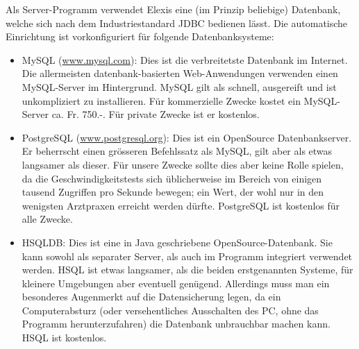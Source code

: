 Als Server-Programm verwendet Elexis eine (im Prinzip beliebige) Datenbank, welche sich nach dem
Industriestandard JDBC bedienen lässt. Die automatische Einrichtung ist vorkonfiguriert für folgende
Datenbanksysteme:
\begin{itemize}
\item MySQL (\href{http://www.mysql.com}{www.mysql.com}): Dies ist die verbreitetste Datenbank im Internet. Die allermeisten
datenbank-basierten
 Web-Anwendungen verwenden einen MySQL-Server im Hintergrund. MySQL gilt als schnell, ausgereift und ist
 unkompliziert zu installieren. Für kommerzielle Zwecke kostet ein MySQL-Server ca. Fr. 750.-. Für private
 Zwecke ist er kostenlos.

\item PostgreSQL (\href{http://www.postgresql.org}{www.postgresql.org}): Dies ist
ein OpenSource Datenbankserver. Er beherrscht einen grösseren Befehlssatz als MySQL,
 gilt aber als etwas langsamer als dieser. Für unsere Zwecke sollte dies aber keine Rolle spielen, da die
 Geschwindigkeitstests sich üblicherweise im Bereich von einigen tausend Zugriffen pro Sekunde bewegen;
 ein Wert, der wohl nur in den wenigsten Arztpraxen erreicht werden dürfte. PostgreSQL ist kostenlos für alle
 Zwecke.

\item HSQLDB: Dies ist eine in Java geschriebene OpenSource-Datenbank. Sie kann sowohl als separater Server, als auch
im Programm integriert verwendet werden. HSQL ist etwas langsamer, als die beiden erstgenannten Systeme, für kleinere
Umgebungen aber eventuell genügend. Allerdings muss man ein besonderes Augenmerkt auf die Datensicherung legen, da ein
Computerabsturz (oder versehentliches Ausschalten des PC, ohne das Programm herunterzufahren) die Datenbank unbrauchbar
machen kann. HSQL ist kostenlos.
\end{itemize}


